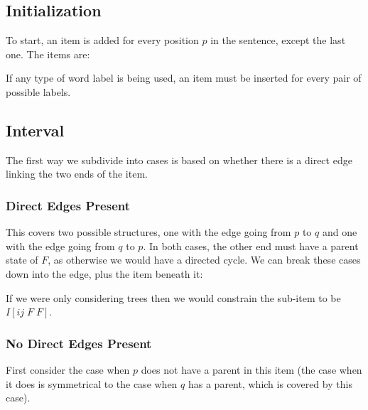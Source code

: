 \subsection{Initialization}

To start, an item is added for every position $p$ in the sentence, except the last one. The items are:


If any type of word label is being used, an item must be inserted for every pair of possible labels.

\subsection{Interval}
The first way we subdivide into cases is based on whether there is a direct edge linking the two ends of the item.

\subsubsection{Direct Edges Present}

\begin{center}
\end{center}

This covers two possible structures, one with the edge going from $p$ to $q$ and one with the edge going from $q$ to $p$.
In both cases, the other end must have a parent state of $F$, as otherwise we would have a directed cycle.
We can break these cases down into the edge, plus the item beneath it:


If we were only considering trees then we would constrain the sub-item to be $I[ij \; F \; F]$.

\subsubsection{No Direct Edges Present}

First consider the case when $p$ does not have a parent in this item (the case when it does is symmetrical to the case when $q$ has a parent, which is covered by this case).


